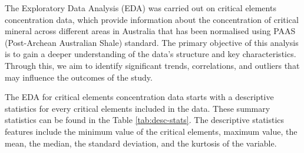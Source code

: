 \documentclass[11pt,a4paper,]{article}
\begin{document}
The Exploratory Data Analysis (EDA) was carried out on critical elements concentration data, which provide information about the concentration of critical mineral across different areas in Australia that has been normalised using PAAS (Post-Archean Australian Shale) standard. The primary objective of this analysis is to gain a deeper understanding of the data's structure and key characteristics. Through this, we aim to identify significant trends, correlations, and outliers that may influence the outcomes of the study.

The EDA for critical elements concentration data starts with a descriptive statistics for every critical elements included in the data. These summary statistics can be found in the Table \ref{tab:desc-stats}. The descriptive statistics features include the minimum value of the critical elements, maximum value, the mean, the median, the standard deviation, and the kurtosis of the variable.

\begingroup\fontsize{9}{11}\selectfont
\end{document}
